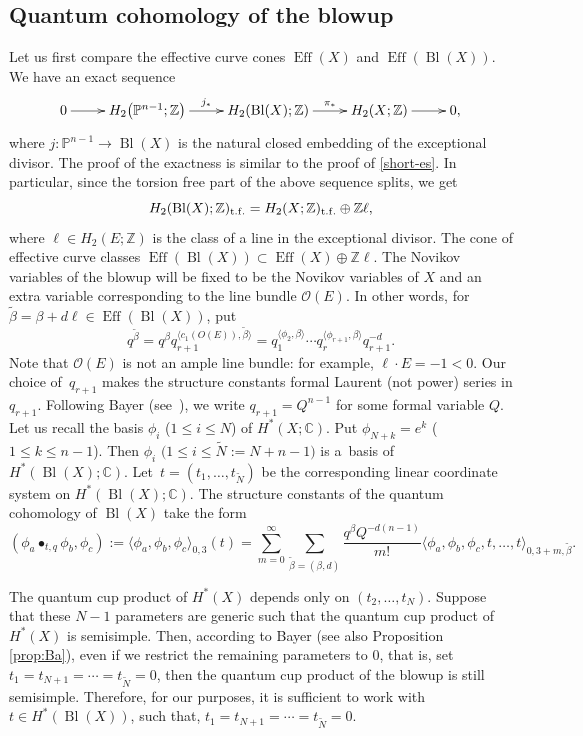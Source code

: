 \documentclass[pdftex]{sigma}
\numberwithin{equation}{section}
\newcommand{\CC}{\mathbb{C}}
\newcommand{\ZZ}{\mathbb{Z}}
\newcommand{\PP}{\mathbb{P}}
\renewcommand{\O}{\mathcal{O}}
\begin{document}
\subsection{Quantum cohomology of the blowup}\label{sec:qcoh_blowup}
Let us first compare the effective curve cones $\operatorname{Eff}(X)$
and $\operatorname{Eff}(\operatorname{Bl}(X)).$ We have an exact sequence
\[
\xymatrix{0\ar[r] &
 H_2\big(\PP^{n-1};\ZZ\big) \ar[r]^-{j_*} &
 H_2(\operatorname{Bl}(X);\ZZ) \ar[r]^-{\pi_*} &
 H_2(X;\ZZ)\ar[r] & 0,}
\]
where $j\colon \PP^{n-1}\to \operatorname{Bl}(X)$ is the natural closed
embedding of the exceptional divisor. The proof of the exactness is
similar to the proof of \eqref{short-es}. In particular, since the torsion
free part of the above sequence splits, we get
\[
H_2(\operatorname{Bl}(X);\ZZ)_{\rm t.f.} = H_2(X;\ZZ)_{\rm t.f.} \oplus
\ZZ \ell,
\]
where $\ell\in H_2(E;\ZZ)$ is the class of a line in the exceptional
divisor. The cone of effective curve classes
$\operatorname{Eff}(\operatorname{Bl}(X))\subset \operatorname{Eff}(X) \oplus
\ZZ \ell$. The Novikov variables of the blowup will be fixed to be
the Novikov variables of $X$ and an extra variable corresponding to
the line bundle $\O(E)$. In other words, for $\widetilde{\beta} = \beta+ d \ell \in
\operatorname{Eff}(\operatorname{Bl}(X))$, put
\[
q^{\widetilde{\beta}} =
q^\beta q_{r+1}^{\langle c_1(O(E)),\widetilde{\beta}\rangle}=
q_1^{\langle \phi_2,\beta\rangle}\cdots
q_r^{\langle \phi_{r+1},\beta\rangle}
q_{r+1}^{-d}.
\]
Note that $\O(E)$ is not an ample line bundle: for example,
$\ell\cdot E =-1<0$. Our choice of~$q_{r+1}$ makes the structure constants formal Laurent (not power) series in
$q_{r+1}$. Following Bayer (see~\cite{Ba}), we write $q_{r+1}=Q^{n-1}$
for some formal variable $Q$.
Let us recall the basis $\phi_i$ ($1\leq i\leq N$) of
$H^*(X;\CC)$. Put $\phi_{N+k} = e^k$ ($1\leq k\leq n-1$). Then
$\phi_i$ $\big(1\leq i\leq \widetilde{N}:=N+n-1\big)$ is a~basis of
$H^*(\operatorname{Bl}(X);\CC)$. Let~${t=(t_1,\dots,t_{\widetilde{N}})}$
be the corresponding linear coordinate system on
$H^*(\operatorname{Bl}(X);\CC)$.
The structure constants of the quantum cohomology of $\operatorname{Bl}(X)$
take the form
\[
(\phi_a\bullet_{t,q} \phi_b,\phi_c):=
\langle \phi_a, \phi_b,\phi_c\rangle_{0,3}(t) =
\sum_{m=0}^\infty
\sum_{\widetilde{\beta}=(\beta,d)}
\frac{q^\beta Q^{-d(n-1)}}{m!}
\langle
\phi_a,\phi_b,\phi_c,t,\dots,t\rangle_{0,3+m,\widetilde{\beta}}.
\]
\begin{Remark}
The quantum cup product of $H^*(X)$ depends only on
$(t_2,\dots,t_N)$. Suppose that these $N-1$ parameters are generic
such that the quantum cup product of $H^*(X)$ is semisimple. Then,
according to Bayer \cite{Ba} (see also Proposition \ref{prop:Ba}),
even if we restrict the remaining parameters to $0$, that is, set
$t_1=t_{N+1}=\cdots=t_{\widetilde{N}}=0$, then the quantum cup product
of the blowup is still semisimple. Therefore, for our purposes, it is
sufficient to work with $t\in H^*(\operatorname{Bl}(X))$, such that,
$t_1=t_{N+1}=\cdots=t_{\widetilde{N}}=0$.
\end{Remark}
\end{document}
